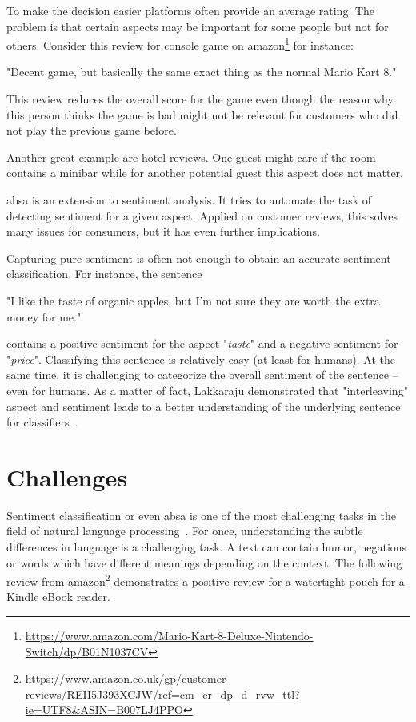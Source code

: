 To make the decision easier platforms often provide an average rating. The problem is that certain aspects may be important for some people but not for others. Consider this review for console game on amazon\footnote{\url{https://www.amazon.com/Mario-Kart-8-Deluxe-Nintendo-Switch/dp/B01N1037CV}} for instance:

\begin{center}
    "Decent game, but basically the same exact thing as the normal Mario Kart 8."
\end{center}

This review reduces the overall score for the game even though the reason why this person thinks the game is bad might not be relevant for customers who did not play the previous game before. 

Another great example are hotel reviews. One guest might care if the room contains a minibar while for another potential guest this aspect does not matter.
\bigskip

\acrfull{absa} is an extension to sentiment analysis. It tries to automate the task of detecting sentiment for a given aspect. Applied on customer reviews, this solves many issues for consumers, but it has even further implications.
\medskip

Capturing pure sentiment is often not enough to obtain an accurate sentiment classification. For instance, the sentence

\begin{center}
    "I like the taste of organic apples, but I'm not sure they are worth the extra money for me."
\end{center}

contains a positive sentiment for the aspect "\textit{taste}" and a negative sentiment for "\textit{price}". Classifying this sentence is relatively easy {(at least for humans)}. At the same time, it is challenging to categorize the overall sentiment of the sentence -- even for humans. As a matter of fact, Lakkaraju demonstrated that "interleaving" aspect and sentiment leads to a better understanding of the underlying sentence for classifiers~\cite{Lakkaraju2014}.


\section{Challenges}

Sentiment classification or even \acrfull{absa} is one of the most challenging tasks in the field of natural language processing~\cite{Pang2012}. For once, understanding the subtle differences in language is a challenging task. A text can contain humor, negations or words which have different meanings depending on the context. The following review from amazon\footnote{\url{https://www.amazon.co.uk/gp/customer-reviews/REII5J393XCJW/ref=cm_cr_dp_d_rvw_ttl?ie=UTF8&ASIN=B007LJ4PPO}} demonstrates a positive review for a watertight pouch for a Kindle eBook reader.

